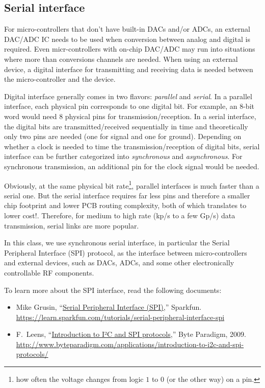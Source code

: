 \documentclass[letterpaper, 11pt]{article}
\begin{document}
\subsection{Serial interface}

For micro-controllers that don't have built-in DACs and/or ADCs, an external DAC/ADC IC needs to be used when conversion between analog and digital is required. Even micr-controllers with on-chip DAC/ADC may run into situations where more than conversions channels are needed. When using an external device, a digital interface for transmitting and receiving data is needed between the micro-controller and the device. 

Digital interface generally comes in two flavors: \textit{parallel} and \textit{serial}. In a parallel interface, each physical pin corresponds to one digital bit. For example, an 8-bit word would need 8 physical pins for transmission/reception. In a serial interface, the digital bits are transmitted/received sequentially in time and theoretically only two pins are needed (one for signal and one for ground). Depending on whether a clock is needed to time the transmission/reception of digital bits, serial interface can be further categorized into \textit{synchronous} and \textit{asynchronous}. For synchronous transmission, an additional pin for the clock signal would be needed.

Obviously, at the same physical bit rate\footnote{how often the voltage changes from logic $1$ to $0$ (or the other way) on a pin.}, parallel interfaces is much faster than a serial one. But the serial interface requires far less pins and therefore a smaller chip footprint and lower PCB routing complexity, both of which translates to lower cost!. Therefore, for medium to high rate (kp/s to a few Gp/s) data transmission, serial links are more popular.

In this class, we use synchronous serial interface, in particular the Serial Peripheral Interface (SPI) protocol, as the interface between micro-controllers and external devices, such as DACs, ADCs, and some other electronically controllable RF components. 

To learn more about the SPI interface, read the following documents:
\begin{itemize}[itemsep=0.1ex]
	\item Mike Grusin, ``\href{https://learn.sparkfun.com/tutorials/serial-peripheral-interface-spi}{Serial Peripheral Interface (SPI)},'' Sparkfun. \url{https://learn.sparkfun.com/tutorials/serial-peripheral-interface-spi}
	\item F.~Leens, ``\href{http://www.byteparadigm.com/applications/introduction-to-i2c-and-spi-protocols/}{Introduction to I²C and SPI protocols},'' Byte Paradigm, 2009. \url{http://www.byteparadigm.com/applications/introduction-to-i2c-and-spi-protocols/}
\end{itemize}
\end{document}
